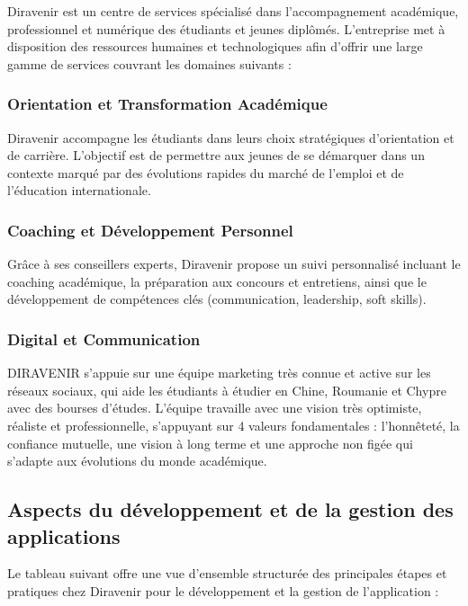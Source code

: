 \documentclass[12pt,a4paper]{report}
\begin{document}
Diravenir est un centre de services spécialisé dans l'accompagnement académique, professionnel et numérique des étudiants et jeunes diplômés. L'entreprise met à disposition des ressources humaines et technologiques afin d'offrir une large gamme de services couvrant les domaines suivants :

\subsubsection{Orientation et Transformation Académique}

Diravenir accompagne les étudiants dans leurs choix stratégiques d'orientation et de carrière. L'objectif est de permettre aux jeunes de se démarquer dans un contexte marqué par des évolutions rapides du marché de l'emploi et de l'éducation internationale.

\subsubsection{Coaching et Développement Personnel}

Grâce à ses conseillers experts, Diravenir propose un suivi personnalisé incluant le coaching académique, la préparation aux concours et entretiens, ainsi que le développement de compétences clés (communication, leadership, soft skills).

\subsubsection{Digital et Communication}

DIRAVENIR s'appuie sur une équipe marketing très connue et active sur les réseaux sociaux, qui aide les étudiants à étudier en Chine, Roumanie et Chypre avec des bourses d'études. L'équipe travaille avec une vision très optimiste, réaliste et professionnelle, s'appuyant sur 4 valeurs fondamentales : l'honnêteté, la confiance mutuelle, une vision à long terme et une approche non figée qui s'adapte aux évolutions du monde académique.


\subsection{Aspects du développement et de la gestion des applications}

Le tableau suivant offre une vue d'ensemble structurée des principales étapes et pratiques chez Diravenir pour le développement et la gestion de l'application :
\end{document}
